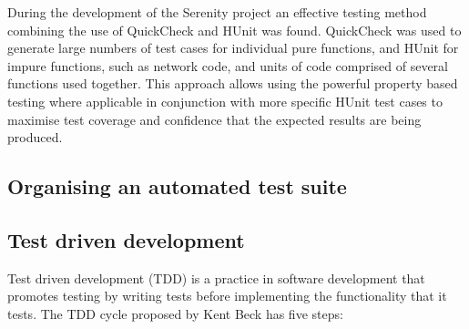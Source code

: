 During the development of the Serenity project an effective testing method combining the
use of QuickCheck and HUnit was found. QuickCheck was used to generate large numbers of
test cases for individual pure functions, and HUnit for impure functions, such as network
code, and units of code comprised of several functions used together. This approach allows
using the powerful property based testing where applicable in conjunction with more specific
HUnit test cases to maximise test coverage and confidence that the expected results are
being produced.


\subsection{Organising an automated test suite}


\subsection{Test driven development}

Test driven development (TDD) is a practice in software development that promotes testing
by writing tests before implementing the functionality that it tests. The TDD cycle
proposed by Kent Beck has five steps:\cite{beck2003}

